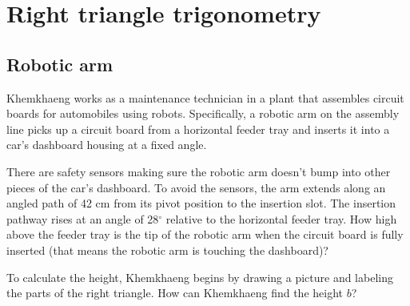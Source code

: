 
\section{Right triangle trigonometry} 

\subsection*{Robotic arm}

Khemkhaeng works as a maintenance technician in a plant that assembles circuit boards for automobiles using robots. Specifically, a robotic arm on the assembly line picks up a circuit board from a horizontal feeder tray and inserts it into a car's dashboard housing at a fixed angle.

There are safety sensors making sure the robotic arm doesn't bump into other pieces of the car's dashboard.  To avoid the sensors, the arm extends along an angled path of 42 cm from its pivot position to the insertion slot.  The insertion pathway rises at an angle of 28$^\circ$ relative to the horizontal feeder tray. How high above the feeder tray is the tip of the robotic arm when the circuit board is fully inserted (that means the robotic arm is touching the dashboard)?

To calculate the height, Khemkhaeng begins by drawing a picture and labeling the parts of the right triangle. How can Khemkhaeng find the height $b$?

\begin{center}
\end{center}

